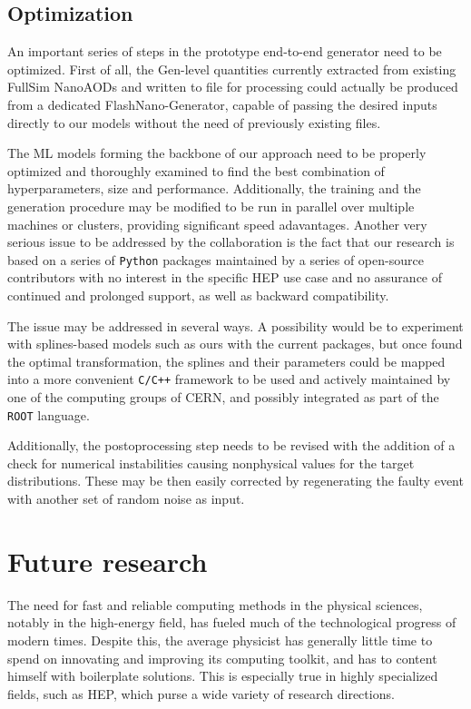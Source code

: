 \subsection{Optimization}
An important series of steps in the prototype end-to-end generator need to be optimized. 
First of all, the Gen-level quantities currently extracted from existing FullSim NanoAODs and written to file for processing could actually be produced from a dedicated FlashNano-Generator, capable of passing the desired inputs directly to our models without the need of previously existing files.

The ML models forming the backbone of our approach need to be properly optimized and thoroughly examined to find the best combination of hyperparameters, size and performance. Additionally, the training and the generation procedure may be modified to be run in parallel over multiple machines or clusters, providing significant speed adavantages. Another very serious issue to be addressed by the collaboration is the fact that our research is based on a series of \texttt{Python} packages maintained by a series of open-source contributors with no interest in the specific HEP use case and no assurance of continued and prolonged support, as well as backward compatibility.

The issue may be addressed in several ways. A possibility would be to experiment with splines-based models such as ours with the current packages, but once found the optimal transformation, the splines and their parameters could be mapped into a more convenient \texttt{C/C++} framework to be used and actively maintained by one of the computing groups of CERN, and possibly integrated as part of the \texttt{ROOT} language.

Additionally, the postoprocessing step needs to be revised with the addition of a check for numerical instabilities causing nonphysical values for the target distributions. These may be then easily corrected by regenerating the faulty event with another set of random noise as input.

\section{Future research}
The need for fast and reliable computing methods in the physical sciences, notably in the high-energy field, has fueled much of the technological progress of modern times. Despite this, the average physicist has generally little time to spend on innovating and improving its computing toolkit, and has to content himself with boilerplate solutions. This is especially true in highly specialized fields, such as HEP, which purse a wide variety of research directions.


